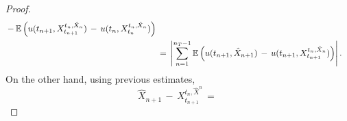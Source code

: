\begin{proof}
\begin{equation*}
\begin{aligned}
{            \,-\,\mathbb E\left(u(t_{n+1}, X^{t_{n},\hat X_n}_{t_{n+1}})
                \,-\,u(t_n,X^{t_n,\hat X_n}_{t_n})\right) } \\
        & \,=\, \left|  \sum_{n=1}^{n_T-1} \mathbb E \left( u(t_{n+1}, \hat
                X_{n+1}) \,-\, u(t_{n+1}, X^{t_{n},\hat X_n}_{t_{n+1}}) \right)  \right|.
        \end{aligned}
    \end{equation*}
    On the other hand, using previous estimates,
    \begin{equation*}
        \hat X_{n+1} \,-\, X^{t_n,\hat X^n}_{t_{n+1}} \,=\,  
    \end{equation*}
    


\end{proof}




